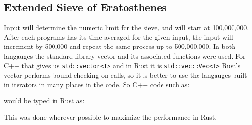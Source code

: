 \documentclass[10pt]{IEEEtran}
\begin{document}
\subsection{Extended Sieve of Eratosthenes}
Input will determine the numeric limit for the sieve, and will start at 100,000,000.
After each programs has its time averaged for the given input, the input will increment by 500,000 and repeat the same process up to 500,000,000.
% 
% 
% 
% 
% 
%         
% 
% 
%             
%         
% 
In both langauges the standard library vector and its associated functions were used.
For C++ that gives us \verb|std::vector<T>| and in Rust it is \verb|std::vec::Vec<T>| 
Rust's vector performs bound checking on calls, so 
it is better to use the langauges built in iterators in many places in 
the code. So C++ code such as:

would be typed in Rust as:

This was done wherever possible to maximize the performance in Rust.
\end{document}
